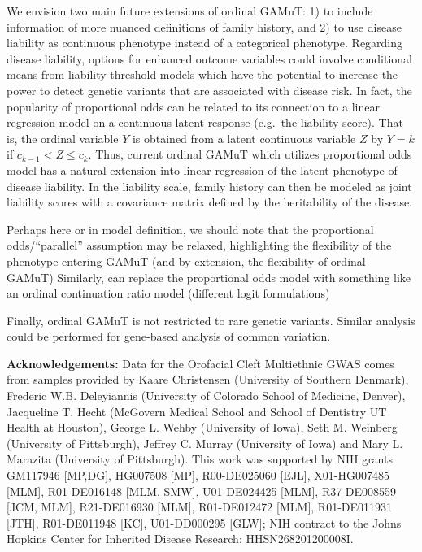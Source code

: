 \documentclass[]{article}
\theoremstyle{definition}
\theoremstyle{definition}
\theoremstyle{definition}
\theoremstyle{remark}
\begin{document}
We envision two main future extensions of ordinal GAMuT: 1) to include
information of more nuanced definitions of family history, and 2) to use
disease liability as continuous phenotype instead of a categorical
phenotype. Regarding disease liability, options for enhanced outcome
variables could involve conditional means from liability-threshold
models which have the potential to increase the power to detect genetic
variants that are associated with disease risk. In fact, the popularity
of proportional odds can be related to its connection to a linear
regression model on a continuous latent response (e.g.~the liability
score). That is, the ordinal variable \(Y\) is obtained from a latent
continuous variable \(Z\) by \(Y=k\) if \(c_{k-1} < Z \leq c_k\). Thus,
current ordinal GAMuT which utilizes proportional odds model has a
natural extension into linear regression of the latent phenotype of
disease liability. In the liability scale, family history can then be
modeled as joint liability scores with a covariance matrix defined by
the heritability of the disease.

Perhaps here or in model definition, we should note that the
proportional odds/``parallel'' assumption may be relaxed, highlighting
the flexibility of the phenotype entering GAMuT (and by extension, the
flexibility of ordinal GAMuT) Similarly, can replace the proportional
odds model with something like an ordinal continuation ratio model
(different logit formulations)

Finally, ordinal GAMuT is not restricted to rare genetic variants.
Similar analysis could be performed for gene-based analysis of common
variation.

\textbf{Acknowledgements:} Data for the Orofacial Cleft Multiethnic GWAS
comes from samples provided by Kaare Christensen (University of Southern
Denmark), Frederic W.B. Deleyiannis (University of Colorado School of
Medicine, Denver), Jacqueline T. Hecht (McGovern Medical School and
School of Dentistry UT Health at Houston), George L. Wehby (University
of Iowa), Seth M. Weinberg (University of Pittsburgh), Jeffrey C. Murray
(University of Iowa) and Mary L. Marazita (University of Pittsburgh).
This work was supported by NIH grants GM117946 {[}MP,DG{]}, HG007508
{[}MP{]}, R00-DE025060 {[}EJL{]}, X01-HG007485 {[}MLM{]}, R01-DE016148
{[}MLM, SMW{]}, U01-DE024425 {[}MLM{]}, R37-DE008559 {[}JCM, MLM{]},
R21-DE016930 {[}MLM{]}, R01-DE012472 {[}MLM{]}, R01-DE011931 {[}JTH{]},
R01-DE011948 {[}KC{]}, U01-DD000295 {[}GLW{]}; NIH contract to the Johns
Hopkins Center for Inherited Disease Research: HHSN268201200008I.
\end{document}
